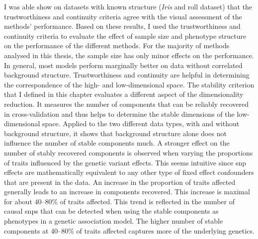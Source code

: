 I was able show on datasets with known structure (\textit{Iris} and roll dataset) that the trustworthiness and continuity criteria agree with the visual assessment of the methods' performance. Based on these results, I used the trustworthiness and continuity criteria to evaluate the effect of sample size and phenotype structure on the performance of the different methods. For the majority of methods analysed in this thesis, the sample size has only minor effects on the performance. In general, most models perform marginally better on data without correlated background structure. Trustworthiness and continuity are helpful in determining the correspondence of the high- and low-dimensional space. The stability criterion that I defined in this chapter evaluates a different aspect of the dimensionality reduction. It measures the number of components that can be reliably recovered in cross-validation and thus helps to determine the stable dimensions of the low-dimensional space. Applied to the two different data types, with and without background structure, it shows that background structure alone does not influence the number of stable components much. A stronger effect on the number of stably recovered components is observed when varying the proportions of traits influenced by the genetic variant effects. This seems intuitive since \gls{snp} effects are mathematically equivalent to any other type of fixed effect confounders that are present in the data. An increase in the proportion of traits affected generally leads to an increase in components recovered. This increase is maximal for about \numrange{40}{80}\% of traits affected. This trend is reflected in the number of causal \glspl{snp} that can be detected when using the stable components as phenotypes in a genetic association model. The higher number of stable components at \numrange{40}{80}\% of traits affected captures more of the underlying genetics. 

